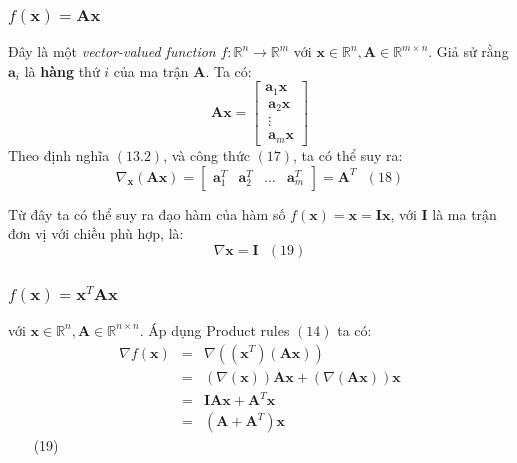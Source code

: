 \documentclass[12pt]{article}
\begin{document}
\subsubsection{$f(\mathbf{x}) = \mathbf{Ax}$}
Đây là một \textit{vector-valued function} $f: \mathbb{R}^n \rightarrow \mathbb{R}^{m} $ với $\mathbf{x} \in \mathbb{R}^n, \mathbf{A} \in \mathbb{R}^{m\times n}$. Giả sử rằng $\mathbf{a}_i$ là \textbf{hàng} thứ $i$ của ma trận $\mathbf{A}$. Ta có:  
\begin{equation*} 
\mathbf{Ax}  =  
\left[ 
\begin{matrix} 
    \mathbf{a}_1\mathbf{x} \\\ 
    \mathbf{a}_2\mathbf{x} \\\ 
    \vdots\\\ 
    \mathbf{a}_m\mathbf{x}  
\end{matrix} 
\right] 
\end{equation*} 
Theo định nghĩa $(13.2)$, và công thức $(17)$, ta có thể suy ra: 
\begin{equation*} 
\nabla_{\mathbf{x}} (\mathbf{Ax}) =  
\left[ 
\begin{matrix} 
    \mathbf{a}_1^T & \mathbf{a}_2^T & \dots & \mathbf{a}_m^T 
\end{matrix} 
\right] = \mathbf{A}^T ~~~ (18) 
\end{equation*} 
 
Từ đây ta có thể suy ra đạo hàm của hàm số $f(\mathbf{x}) = \mathbf{x} = \mathbf{Ix}$, với $\mathbf{I}$ là ma trận đơn vị với chiều phù hợp, là: 
\begin{equation*} 
\nabla \mathbf{x} = \mathbf{I} ~~~ (19) 
\end{equation*} 
 
\subsubsection{$f(\mathbf{x}) = \mathbf{x}^T\mathbf{A} \mathbf{x}$}
với $\mathbf{x} \in \mathbb{R}^n, \mathbf{A} \in \mathbb{R}^{n\times n}$. Áp dụng Product rules $(14)$ ta có: 
\begin{eqnarray} 
\nabla f(\mathbf{x}) &=& \nabla \left(\left(\mathbf{x}^T\right) \left(\mathbf{Ax}\right)\right) \\\ 
                     &=& \left(\nabla (\mathbf{x})\right) \mathbf{Ax} + \left(\nabla (\mathbf{Ax})\right)\mathbf{x} \\\  
                     & = & \mathbf{IAx} + \mathbf{A}^T\mathbf{x} \\\ 
                     & = & (\mathbf{A} + \mathbf{A}^T)\mathbf{x} 
\end{eqnarray} ~~~ (19) 
 
\end{document}
